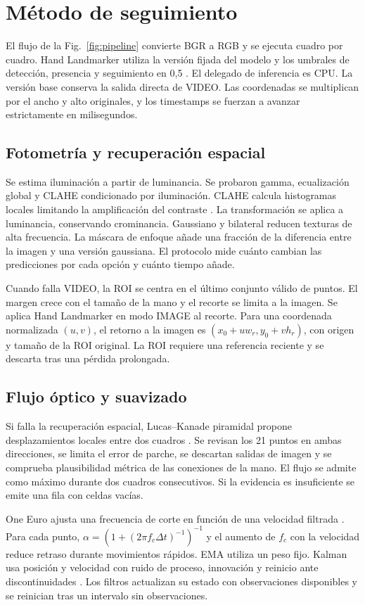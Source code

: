 \documentclass[conference]{IEEEtran}
\begin{document}
\section{Método de seguimiento}
El flujo de la Fig.~\ref{fig:pipeline} convierte BGR a RGB y se ejecuta cuadro por cuadro. Hand Landmarker utiliza la versión fijada del modelo y los umbrales de detección, presencia y seguimiento en 0,5 \cite{mediapipe}. El delegado de inferencia es CPU. La versión base conserva la salida directa de VIDEO. Las coordenadas se multiplican por el ancho y alto originales, y los timestamps se fuerzan a avanzar estrictamente en milisegundos.

\subsection{Fotometría y recuperación espacial}
Se estima iluminación a partir de luminancia. Se probaron gamma, ecualización global y CLAHE condicionado por iluminación. CLAHE calcula histogramas locales limitando la amplificación del contraste \cite{zuiderveld1994}. La transformación se aplica a luminancia, conservando crominancia. Gaussiano y bilateral reducen texturas de alta frecuencia. La máscara de enfoque añade una fracción de la diferencia entre la imagen y una versión gaussiana. El protocolo mide cuánto cambian las predicciones por cada opción y cuánto tiempo añade.

Cuando falla VIDEO, la ROI se centra en el último conjunto válido de puntos. El margen crece con el tamaño de la mano y el recorte se limita a la imagen. Se aplica Hand Landmarker en modo IMAGE al recorte. Para una coordenada normalizada $(u,v)$, el retorno a la imagen es $(x_0+u w_r,y_0+v h_r)$, con origen y tamaño de la ROI original. La ROI requiere una referencia reciente y se descarta tras una pérdida prolongada.

\subsection{Flujo óptico y suavizado}
Si falla la recuperación espacial, Lucas--Kanade piramidal propone desplazamientos locales entre dos cuadros \cite{lucas1981}. Se revisan los 21 puntos en ambas direcciones, se limita el error de parche, se descartan salidas de imagen y se comprueba plausibilidad métrica de las conexiones de la mano. El flujo se admite como máximo durante dos cuadros consecutivos. Si la evidencia es insuficiente se emite una fila con celdas vacías.

One Euro ajusta una frecuencia de corte en función de una velocidad filtrada \cite{casiez2012}. Para cada punto, $\alpha=\left(1+(2\pi f_c\Delta t)^{-1}\right)^{-1}$ y el aumento de $f_c$ con la velocidad reduce retraso durante movimientos rápidos. EMA utiliza un peso fijo. Kalman usa posición y velocidad con ruido de proceso, innovación y reinicio ante discontinuidades \cite{kalman1960}. Los filtros actualizan su estado con observaciones disponibles y se reinician tras un intervalo sin observaciones.
\end{document}
